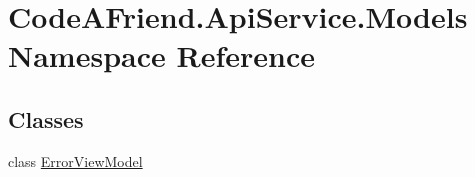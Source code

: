 \hypertarget{namespace_code_a_friend_1_1_api_service_1_1_models}{}\section{Code\+A\+Friend.\+Api\+Service.\+Models Namespace Reference}
\label{namespace_code_a_friend_1_1_api_service_1_1_models}
\subsection*{Classes}
\begin{DoxyCompactItemize}
\item 
class \mbox{\hyperlink{class_code_a_friend_1_1_api_service_1_1_models_1_1_error_view_model}{Error\+View\+Model}}
\end{DoxyCompactItemize}

